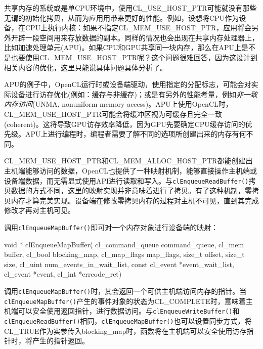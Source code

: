 共享内存的系统或是单CPU环境中，使用CL\_\allowbreak{}USE\_\allowbreak{}HOST\_\allowbreak{}PTR可能就没有那些无谓的初始化拷贝，从而为应用用带来更好的性能。例如，设想将CPU作为设备，在CPU上执行内核：如果不指定CL\_\allowbreak{}MEM\_\allowbreak{}USE\_\allowbreak{}HOST\_\allowbreak{}PTR，应用将会另外开辟一段空间用来存放数据的副本。同样的情况也会出现在共享内存处理器上，比如加速处理单元(APU)。如果CPU和GPU共享同一块内存，那么在APU上是不是也要使用CL\_\allowbreak{}MEM\_\allowbreak{}USE\_\allowbreak{}HOST\_\allowbreak{}PTR呢？这个问题很难回答，因为这设计到相关内容的优化，这里只能说具体问题具体分析了。

APU的例子中，OpenCL运行时或设备端驱动，使用指定的分配标志，可能会对实际设备进行访存优化(例如：缓存与非缓存)；或是有另外的性能考量，例如\emph{非一致内存访问}(UNMA, nonuniform memory access)。APU上使用OpenCL时，CL\_\allowbreak{}MEM\_\allowbreak{}USE\_\allowbreak{}HOST\_\allowbreak{}PTR可能会将缓冲区视为可缓存且完全一致(coherent)。这将导致GPU访存效率降低，因为GPU先要确定CPU缓存访问的优先级。APU上进行编程时，编程者需要了解不同的选项所创建出来的内存有何不同。

CL\_\allowbreak{}MEM\_\allowbreak{}USE\_\allowbreak{}HOST\_\allowbreak{}PTR和CL\_\allowbreak{}MEM\_\allowbreak{}ALLOC\_\allowbreak{}HOST\_\allowbreak{}PTR都能创建出主机端能够访问的数据，OpenCL也提供了一种映射机制，能够直接操作主机端或设备端数据，而无需显式使用API进行读取和写入。与\texttt{clEnqueueReadBuffer()}拷贝数据的方式不同，这里的映射实现并非意味着进行了拷贝。有了这种机制，零拷贝内存才算完美实现。设备端在修改零拷贝内存的过程对主机不可见，直到其完成修改才再对主机可见。

调用\texttt{clEnqueueMapBuffer()}即可对一个内存对象进行设备端的映射：

\begin{codebox}[cpp]
void *
clEnqueueMapBuffer(
  cl_command_queue command_queue,
  cl_mem buffer,
  cl_bool blocking_map,
  cl_map_flags map_flags,
  size_t offset,
  size_t size,
  cl_uint num_events_in_wait_list,
  const cl_event *event_wait_list,
  cl_event *event,
  cl_int *errcode_ret)
\end{codebox}

调用\texttt{clEnqueueMapBuffer()}时，其会返回一个可供主机端访问内存的指针。当\texttt{clEnqueueMapBuffer()}产生的事件对象的状态为CL\_\allowbreak{}COMPLETE时，意味着主机端可以安全使用返回指针，进行数据访问。与\texttt{clEnqueueWriteBuffer()}和\texttt{clEnqueueReadBuffer()}相同，\texttt{clEnqueueMapBuffer()}也可以设置同步方式，将CL\_\allowbreak{}TRUE作为实参传入blocking\_\allowbreak{}map时，函数将在主机端可以安全使用访存指针时，将产生的指针返回。

